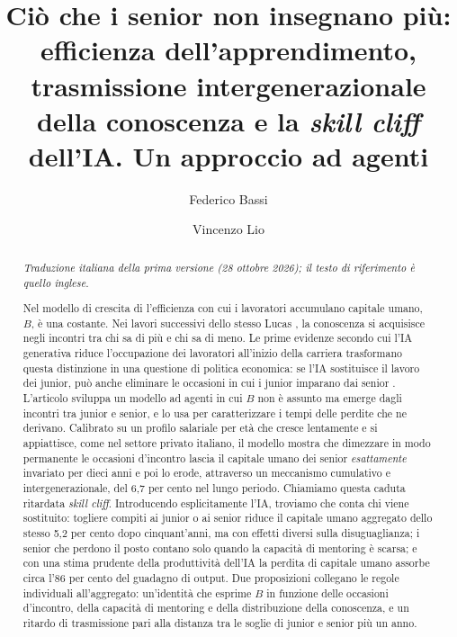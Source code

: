 \documentclass[preprint,12pt,authoryear]{elsarticle}
\newcommand{\todo}[1]{\textcolor{red}{[#1]}}
\begin{document}
\renewcommand{\today}{28 ottobre 2026}  %

\begin{frontmatter}

\title{Ciò che i senior non insegnano più: efficienza dell'apprendimento, trasmissione intergenerazionale della conoscenza e la \emph{skill cliff} dell'IA. Un approccio ad agenti}

\author[aff1]{Federico Bassi}
\author[aff2]{Vincenzo Lio}
\affiliation[aff1]{organization={\todo{Affiliazione}},country={\todo{Paese}}}
\affiliation[aff2]{organization={\todo{Affiliazione}},country={Italia}}

\begin{abstract}
\emph{Traduzione italiana della prima versione (28 ottobre 2026); il testo di riferimento è quello inglese.}

\smallskip
Nel modello di crescita di \citet{Lucas1988} l'efficienza con cui i lavoratori accumulano capitale umano, $B$, è una costante. Nei lavori successivi dello stesso Lucas \citep{Lucas2009,LucasMoll2014}, la conoscenza si acquisisce negli incontri tra chi sa di più e chi sa di meno. Le prime evidenze secondo cui l'IA generativa riduce l'occupazione dei lavoratori all'inizio della carriera \citep{Brynjolfsson2025,HosseiniLichtinger2025} trasformano questa distinzione in una questione di politica economica: se l'IA sostituisce il lavoro dei junior, può anche eliminare le occasioni in cui i junior imparano dai senior \citep{Ide2026}. L'articolo sviluppa un modello ad agenti in cui $B$ non è assunto ma emerge dagli incontri tra junior e senior, e lo usa per caratterizzare i tempi delle perdite che ne derivano. Calibrato su un profilo salariale per età che cresce lentamente e si appiattisce, come nel settore privato italiano, il modello mostra che dimezzare in modo permanente le occasioni d'incontro lascia il capitale umano dei senior \emph{esattamente} invariato per dieci anni e poi lo erode, attraverso un meccanismo cumulativo e intergenerazionale, del 6,7 per cento nel lungo periodo. Chiamiamo questa caduta ritardata \emph{skill cliff}. Introducendo esplicitamente l'IA, troviamo che conta chi viene sostituito: togliere compiti ai junior o ai senior riduce il capitale umano aggregato dello stesso 5,2 per cento dopo cinquant'anni, ma con effetti diversi sulla disuguaglianza; i senior che perdono il posto contano solo quando la capacità di mentoring è scarsa; e con una stima prudente della produttività dell'IA la perdita di capitale umano assorbe circa l'86 per cento del guadagno di output. Due proposizioni collegano le regole individuali all'aggregato: un'identità che esprime $B$ in funzione delle occasioni d'incontro, della capacità di mentoring e della distribuzione della conoscenza, e un ritardo di trasmissione pari alla distanza tra le soglie di junior e senior più un anno.
\end{abstract}


\end{frontmatter}
\end{document}

